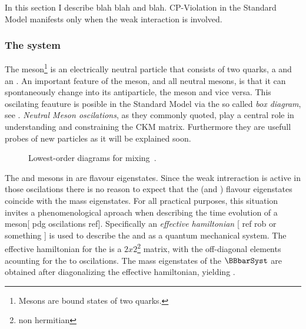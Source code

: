 

{\color{red} In this section I describe blah blah and blah.
CP-Violation in the Standard Model manifests only when the weak interaction is involved.}

\subsubsection{The \BBbarSyst system}
The \Bs meson\footnote{Mesons are bound states of two quarks.} is an electrically neutral
particle that consists of two quarks, a \bquarkbar and an \squark. An important feature of
the \Bs meson, and all neutral mesons, is that it can spontaneously change into its antiparticle,
the \Bsb meson and vice versa. This oscilating feauture is posible in the Standard Model via the
so called {\it box diagram}, see . {\it Neutral Meson oscilations}, as they commonly
quoted, play a central role in understanding and constraining the CKM matrix. Furthermore they are
usefull probes of new particles as it will be explained soon.

\begin{figure}[h]
  \centering
  \begin{subfigure}{0.5\textwidth}
    \centering
    {\sffamily }
    \caption{}
    \label{bs_box_1}
  \end{subfigure}%
  \begin{subfigure}{0.5\textwidth}
    \centering
    {\sffamily }
    \caption{}
    \label{bs_box_2}
  \end{subfigure}
  \caption{Lowest-order diagrams for mixing~\cite{LHCb-PAPER-2013-002}.}
  \label{bs_box}
\end{figure}

The \Bs and \Bsb mesons in  are flavour eigenstates. Since the weak intreraction
is active in those oscilations there is no reason to expect that the \Bs (and \Bsb) flavour eigenstates
coincide with the mass eigenstates. For all practical purposes, this situation invites a phenomenological
aproach when describing the time evolution of a \Bs meson[{\color{red} pdg oscilations ref}]. Specifically
an {\it effective hamiltonian} [{\color{red} ref rob or something} ] is used to describe the \Bs and \Bsb
as a quantum mechanical system. The effective hamiltonian for the \BBbarSyst is a $2x2$\footnote{non hermitian}
matrix, with the off-diagonal elements acounting for the \Bs to \Bsb oscilations.
The mass eigenstates of the $\BBbarSyst$ are obtained after diagonalizing the effective hamiltonian, yielding .

